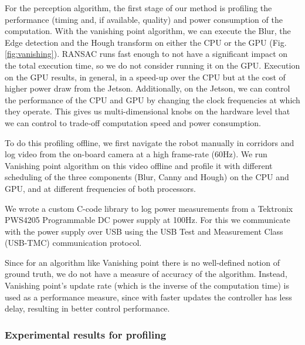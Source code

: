 

For the perception algorithm, the first stage of our method is profiling the performance (timing and, if available, quality) and power consumption of the computation. With the vanishing point algorithm, we can execute the Blur, the Edge detection and the Hough transform on either the CPU or the GPU (Fig. \ref{fig:vanishing}). RANSAC runs fast enough to not have a significant impact on the total execution time, so we do not consider running it on the GPU. Execution on the GPU results, in general, in a speed-up over the CPU but at the cost of higher power draw from the Jetson. Additionally, on the Jetson, we can control the performance of the CPU and GPU by changing the clock frequencies at which they operate. This gives us multi-dimensional knobs on the hardware level that we can control to trade-off computation speed and power consumption.

To do this profiling offline, we first navigate the robot manually in corridors and log video from the on-board camera at a high frame-rate (60Hz). 
We run Vanishing point algorithm on this video offline and profile it with different scheduling of the three components (Blur, Canny and Hough) on the CPU and GPU, and at different frequencies of both processors.

We wrote a custom C-code library to log power measurements from a Tektronix PWS4205 Programmable DC power supply at 100Hz. 
For this we communicate with the power supply over USB using the USB Test and Measurement Class (USB-TMC) communication protocol. 
 
Since for an algorithm like Vanishing point there is no well-defined notion of ground truth, we do not have a measure of accuracy of the algorithm. 
Instead, Vanishing point's update rate (which is the inverse of the computation time) is used as a performance measure, since with faster updates the controller has less delay, resulting in better control performance. 

\subsubsection{Experimental results for profiling}

